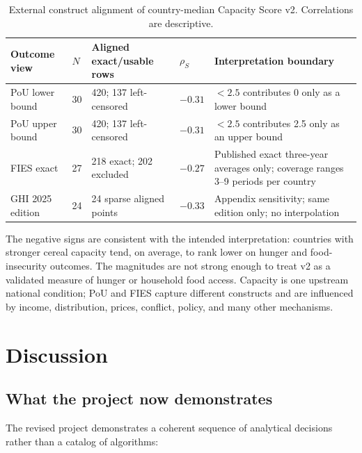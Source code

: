 \documentclass[11pt]{article}
\newcommand{\rhoS}{\ensuremath{\rho_{S}}}
\begin{document}
\begin{table}[H]
\centering
\caption{External construct alignment of country-median Capacity Score v2. Correlations are descriptive.}
\label{tab:external}
\small
\begin{tabularx}{\textwidth}{L{2.45cm} L{1.30cm} L{1.85cm} L{1.55cm} Y}
\toprule
Outcome view & $N$ & Aligned exact/usable rows & \rhoS & Interpretation boundary \\
\midrule
PoU lower bound & 30 & 420; 137 left-censored & $-0.31$ & $<2.5$ contributes 0 only as a lower bound \\
PoU upper bound & 30 & 420; 137 left-censored & $-0.31$ & $<2.5$ contributes 2.5 only as an upper bound \\
FIES exact & 27 & 218 exact; 202 excluded & $-0.27$ & Published exact three-year averages only; coverage ranges 3--9 periods per country \\
GHI 2025 edition & 24 & 24 sparse aligned points & $-0.33$ & Appendix sensitivity; same edition only; no interpolation \\
\bottomrule
\end{tabularx}
\end{table}

The negative signs are consistent with the intended interpretation: countries with stronger cereal capacity tend, on average, to rank lower on hunger and food-insecurity outcomes. The magnitudes are not strong enough to treat v2 as a validated measure of hunger or household food access. Capacity is one upstream national condition; PoU and FIES capture different constructs and are influenced by income, distribution, prices, conflict, policy, and many other mechanisms.

\section{Discussion}

\subsection{What the project now demonstrates}

The revised project demonstrates a coherent sequence of analytical decisions rather than a catalog of algorithms:
\end{document}
